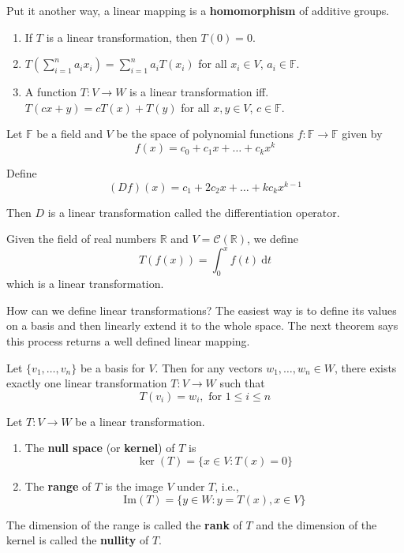 Put it another way, a linear mapping is a \textbf{homomorphism} of additive groups.

\begin{theorem}[Properties] \hfill
	\begin{enumerate}
		\item If $T$ is a linear transformation, then $T(0) = 0$.
		\item $T\left( \sum_{i=1}^n a_i x_i \right) = \sum_{i=1}^n  a_i T(x_i)$ for all $x_i \in V$, $a_i \in \mathbb{F}$.
		\item A function $T : V \longrightarrow W$ is a linear transformation iff. $T(cx+y) = cT(x) + T(y)$ for all $x, y \in V$, $c \in \mathbb{F}$.
	\end{enumerate}
\end{theorem}

\begin{example}
	Let $\mathbb{F}$ be a field and $V$ be the space of polynomial functions $f : \mathbb{F} \longrightarrow \mathbb{F}$ given by
	\[
		f(x) = c_0 + c_1 x + \ldots + c_k x^k
	\]
	
	Define
	\[
		(Df)(x) = c_1 + 2 c_2 x + \ldots + k c_k x^{k-1}
	\]

	Then $D$ is a linear transformation called the differentiation operator.
\end{example}

\begin{example}
	Given the field of real numbers $\mathbb{R}$ and $V = \mathcal{C}(\mathbb{R})$, we define
	\[
		T(f(x)) = \int_0^x f(t) ~\mathrm{d}t
	\]
	which is a linear transformation.
\end{example}

How can we define linear transformations? The easiest way is to define its values on a basis and then linearly extend it to the whole space. The next theorem says this process returns a well defined linear mapping.

\begin{theorem}
	Let $\{ v_1, \ldots, v_n \}$ be a basis for $V$. Then for any vectors $w_1, \ldots, w_n \in W$, there exists exactly one linear transformation $T : V \longrightarrow W$ such that \[ T(v_i) = w_i, \text{ for } 1 \leq i \leq n\]
\end{theorem}

\begin{definition}
	Let $T : V \longrightarrow W$ be a linear transformation. 
	\begin{enumerate}
		\item The \textbf{null space} (or \textbf{kernel}) of $T$ is \[\ker(T) = \{ x \in V : T(x) = 0 \}\]
		\item The \textbf{range} of $T$ is the image $V$ under $T$, i.e., \[\text{Im}(T) = \{ y \in W : y = T(x), x \in V\}\]
	\end{enumerate}

	The dimension of the range is called the \textbf{rank} of $T$ and the dimension of the kernel is called the \textbf{nullity} of $T$.
\end{definition}

